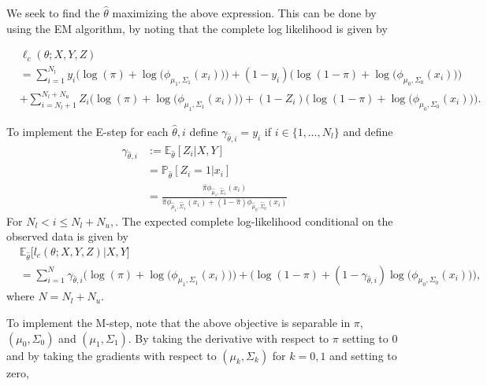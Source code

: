 \begin{itemize}
We seek to find the $\hat{\theta}$ maximizing the above expression. This can be done by using the EM algorithm, by noting that the complete log likelihood is given by 

$$\begin{aligned}
&\ell_c(\theta;X,Y,Z)\\
 & =\sum_{i=1}^{N_l} y_i \Big( \log(\pi)+  \log \big( \phi_{\mu_1, \Sigma_1}(x_i) \big) \Big)+(1-y_i) \Big( \log(1- \pi) + \log \big( \phi_{\mu_0, \Sigma_0}(x_i) \big) \Big) \\
& +\sum_{i=N_l+1}^{N_l+N_u}  Z_i \Big( \log(\pi)+ \log \big( \phi_{\mu_1, \Sigma_1}(x_i) \big) \Big)+ (1-Z_i) \Big( \log(1-\pi) + \log \big( \phi_{\mu_0, \Sigma_0}(x_i) \big) \Big).
\end{aligned}$$

To implement the E-step for each $\hat{\theta},i$ define $\gamma_{\hat{\theta},i} = y_i$ if $i \in \{1,\dots,N_l \}$ and define 
\begin{align*}
	\gamma_{\hat{\theta},i} &:=\mathbb{E}_{\hat{\theta}} [Z_i |X,Y]\\
	& =\mathbb{P}_{\hat{\theta}} [Z_i=1|x_i] \\
	&= \frac{\hat{\pi} \phi_{\hat{\mu}_1, \hat{\Sigma}_1}(x_i) }{\hat{\pi} \phi_{\hat{\mu}_1, \hat{\Sigma}_1}(x_i)+(1-\hat{\pi}) \phi_{\hat{\mu}_0, \hat{\Sigma}_0}(x_i)}
\end{align*} 
For $N_l < i \leq N_l+N_u,$. The expected complete log-likelihood conditional on the observed data is given by
\begin{align}\label{eq:EStep}
&\mathbb{E}_{\hat{\theta}} \big[l_c(\theta;X,Y,Z) \big| X,Y \big] \nonumber \\
&= \sum_{i=1}^{N} \gamma_{\hat{\theta},i} \Big( \log(\pi) + \log \big( \phi_{\mu_1, \Sigma_1}(x_i) \big) \Big) + \Big( \log(1-\pi)  +   (1-\gamma_{\hat{\theta},i}) \log \big( \phi_{\mu_0, \Sigma_0}(x_i) \big) \Big),
\end{align}
where $N =N_l+N_u$.

To implement the M-step, note that the above objective is separable in $\pi$, $(\mu_0,\Sigma_0)$ and $(\mu_1,\Sigma_1)$. By taking the derivative with respect to $\pi$ setting to $0$ and by taking the gradients with respect to $(\mu_k,\Sigma_k)$ for $k=0,1$ and setting to zero,


\end{itemize}
